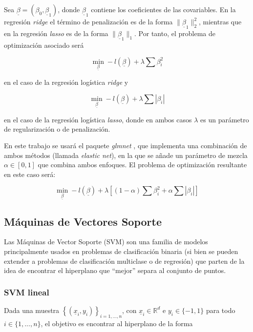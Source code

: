 \documentclass[12pt,a4paper,]{book}
\numberwithin{dummy}{section}
\theoremstyle{ocrenumbox}
\theoremstyle{blacknumex}
\theoremstyle{blacknumbox}
\theoremstyle{ocrenum}
\theoremstyle{ocrenum}
\begin{document}
Sea \(\underline \beta = \left( \beta_0, \underline \beta_1 \right)\),
donde \(\underline \beta_1\) contiene los coeficientes de las
covariables. En la regresión \emph{ridge} el término de penalización es
de la forma \(\| \underline \beta_1 \|^2_2\), mientras que en la
regresión \emph{lasso} es de la forma \(\| \underline \beta_1 \|_1\).
Por tanto, el problema de optimización asociado será

\[\min_{\underline \beta} -l(\underline \beta)  + \lambda \sum \beta_i^2 \]

en el caso de la regresión logística \emph{ridge} y

\[\min_{\underline \beta} -l(\underline \beta)  + \lambda \sum |\beta_i|\]

en el caso de la regresión logística \emph{lasso}, donde en ambos casos
\(\lambda\) es un parámetro de regularización o de penalización.

En este trabajo se usará el paquete \emph{glmnet} \citep{glmnetpackage},
que implementa una combinación de ambos métodos (llamada \emph{elastic
net}), en la que se añade un parámetro de mezcla
\(\alpha \in \left[0,1\right]\) que combina ambos enfoques. El problema
de optimización resultante en este caso será:

\[\min_{\underline \beta} -l(\underline \beta)  + \lambda \left[(1-\alpha)\sum \beta_i^2 + \alpha \sum |\beta_i| \right]\]

\hypertarget{muxe1quinas-de-vectores-soporte}{%
\subsection{Máquinas de Vectores
Soporte}\label{muxe1quinas-de-vectores-soporte}}

Las Máquinas de Vector Soporte (SVM) son una familia de modelos
principalmente usados en problemas de clasificación binaria (si bien se
pueden extender a problemas de clasificación multiclase o de regresión)
que parten de la idea de encontrar el hiperplano que ``mejor'' separa al
conjunto de puntos.

\hypertarget{svm-lineal}{%
\subsubsection{SVM lineal}\label{svm-lineal}}

Dada una muestra \(\left\{(\underline x_i,y_i) \right\}_{i=1,...,n}\),
con \(\underline x_i \in \mathbb{R}^d\) e \(y_i \in \{-1,1\}\) para todo
\(i \in \{1,...,n\}\), el objetivo es encontrar al hiperplano de la
forma
\end{document}
